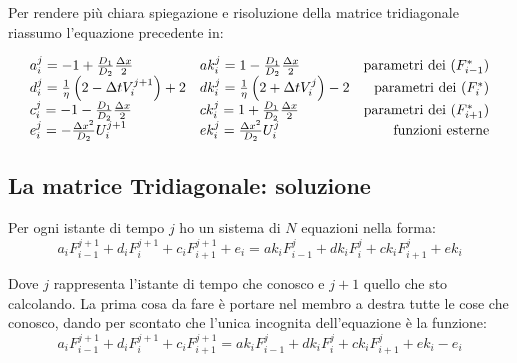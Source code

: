 Per rendere pi\`u chiara spiegazione e risoluzione della matrice tridiagonale riassumo l'equazione precedente in:

\begin{equation}\label{eq:pararametri}
\begin{array}{ll r}
a_i^j = -1+\frac{D_1}{D_2}\frac{\Delta x}2             & ak_i^j =1-\frac{D_1}{D_2}\frac{\Delta x}2&\text{parametri dei }(F^*_{i-1})\\
d_i^j = \frac1\eta\left( 2-\Delta t V_i^{j+1} \right) +2 & dk_i^j = \frac1\eta\left( 2+\Delta tV_i^{j} \right) -2 &\text{parametri dei }(F^*_{i})\\
c_i^j = -1-\frac{D_1}{D_2}\frac{\Delta x}2             & ck_i^j =1+\frac{D_1}{D_2}\frac{\Delta x}2&\text{parametri dei }(F^*_{i+1})\\
e_i^j = -\frac{\Delta x^2}{D_2} U_i^{j+1}              & ek_i^j =\frac{\Delta x^2}{D_2} U_i^{j}&\text{funzioni esterne}
\end{array}
\end{equation}
\subsection{La matrice Tridiagonale: soluzione}\label{section:soluzionetri}
Per ogni istante di tempo $j$ ho un sistema di $N$ equazioni nella forma:
\begin{equation}
a_{i} F_{i-1}^{j+1}+d_i F_{i}^{j+1} +c_{i}F_{i+1}^{j+1}  + e_i= 
ak_i F_{i-1}^{j}+ dk_i F_{i}^{j} + ck_i F_{i+1}^{j} + ek_i
\end{equation}

Dove $j$ rappresenta l'istante di tempo che conosco e $j+1$ quello che sto calcolando. La prima cosa da fare \`e portare nel membro a destra tutte le cose che conosco, dando per scontato che l'unica incognita dell'equazione \`e la funzione:
\begin{equation}
a_{i} F_{i-1}^{j+1}+d_i F_{i}^{j+1} +c_{i}F_{i+1}^{j+1}= 
ak_i F_{i-1}^{j}+ dk_i F_{i}^{j} + ck_i F_{i+1}^{j} + ek_i - e_i
\end{equation}

